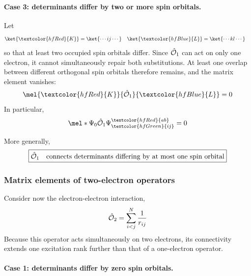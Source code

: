 \documentclass[11pt,a4paper,titlepage]{article}
\numberwithin{equation}{section}
\newcommand{\chO}{\Hat{\mathcal{O}}}
\newcommand{\red}[1]{\textcolor{hfRed}{#1}}
\newcommand{\green}[1]{\textcolor{hfGreen}{#1}}
\newcommand{\blue}[1]{\textcolor{hfBlue}{#1}}
\begin{document}
\paragraph{Case 3: determinants differ by two or more spin orbitals.}

Let
\begin{align}
  \ket{\red{K}}
  &=
  \ket{\cdots i j\cdots}
  &
  \ket{\blue{L}}
  &=
  \ket{\cdots k l\cdots}
\end{align}
so that at least two occupied spin orbitals differ. Since $\chO_1$ can act
on only one electron, it cannot simultaneously repair both substitutions.
At least one overlap between different orthogonal spin orbitals therefore
remains, and the matrix element vanishes:
\begin{equation}
  \mel{\red{K}}{\chO_1}{\blue{L}}
  =
  0
  \label{eq:sc-one-two}
\end{equation}
In particular,
\begin{equation}
  \mel*{\Psi_0}{\chO_1}
  {\Psi_{\green{ij}}^{\red{ab}}}
  =
  0
\end{equation}

More generally,
\begin{equation}
  \boxed{
  \chO_1
  \quad\text{connects determinants differing by at most one spin orbital}
  }
\end{equation}


\subsubsection{Matrix elements of two-electron operators}

Consider now the electron-electron interaction,
\begin{equation}
  \chO_2
  =
  \sum_{i<j}^{N}\frac{1}{r_{ij}}
  \label{eq:slater-condon-two-body}
\end{equation}
Because this operator acts simultaneously on two electrons, its connectivity
extends one excitation rank further than that of a one-electron operator.

\paragraph{Case 1: determinants differ by zero spin orbitals.}
\end{document}
